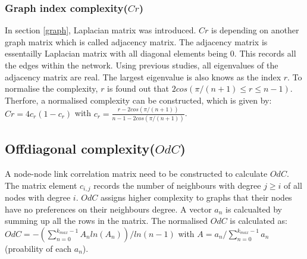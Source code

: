 \documentclass[12pt]{article}
\begin{document}
\subsubsection{Graph index complexity($Cr$)}
In section \ref{graph}, Laplacian matrix was introduced. $Cr$ is depending on another graph matrix which is called adjacency matrix. The adjacency matrix is essentailly Laplacian matrix with all diagonal elements being 0. This records all the edges within the network. Using previous studies, all eigenvalues of the adjacency matrix are real.\cite{brouwer2011spectra} The largest eigenvalue is also knows as the index $r$. To normalise the complexity, $r$ is found out that $2cos(\pi /(n+1) \leq r \leq n-1)$.\cite{brouwer2011spectra} Therfore, a normalised complexity can be constructed, which is given by: $Cr=4c_r(1-c_r)$ with $c_r=\frac{r-2cos(\pi /(n+1))}{n-1-2cos(\pi /(n+1))}$.

\subsection{Offdiagonal complexity($OdC$)}
A node-node link correlation matrix need to be constructed to calculate $OdC$.\cite{odc} The matrix element $c_{i,j}$ records the number of neighbours with degree $j \geq i$ of all nodes with degree $i$. $OdC$ assigns higher complexity to graphs that their nodes have no preferences on their neighbours degree. A vector $a_n$ is calcualted by summing up all the rows in the matrix. The normalised $OdC$ is calculated as:\\
$OdC=-(\sum^{k_{max}-1}_{n=0}A_nln(A_n))/ln(n-1)$ with $A=a_n/\sum_{n=0}^{k_{max}-1}a_n$(proability of each $a_n$).
\end{document}

